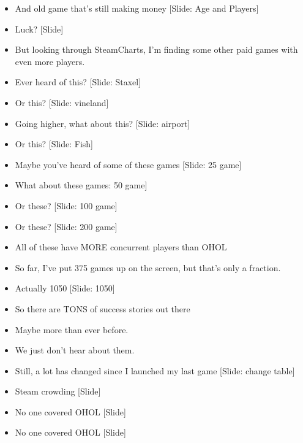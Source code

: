 \documentclass[12pt]{article}
\begin{document}
{\begin{itemize}
\item And old game that's still making money [Slide:  Age and Players]

\item Luck?  [Slide]

\item But looking through SteamCharts, I'm finding some other paid games with even more players.

\item Ever heard of this?  [Slide:  Staxel]

\item Or this?  [Slide: vineland]

\item Going higher, what about this? [Slide: airport]

\item Or this? [Slide: Fish]

\item Maybe you've heard of some of these games [Slide: 25 game]

\item What about these games: 50 game]

\item Or these? [Slide: 100 game]

\item Or these? [Slide: 200 game]

\item All of these have MORE concurrent players than OHOL

\item So far, I've put 375 games up on the screen, but that's only a fraction.

\item Actually 1050 [Slide:  1050]

\item So there are TONS of success stories out there

\item Maybe more than ever before.

\item We just don't hear about them.

\item Still, a lot has changed since I launched my last game [Slide: change table]

\item Steam crowding [Slide]

\item No one covered OHOL [Slide]

\item No one covered OHOL [Slide]


\end{itemize}}
\end{document}
